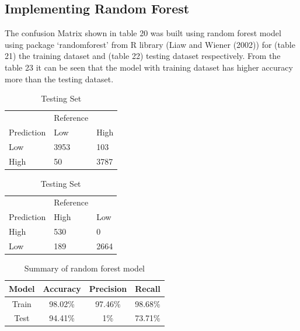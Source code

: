\documentclass[
  a4paper,
]{article}
\begin{document}
\newpage

\hypertarget{implementing-random-forest}{%
\subsection{Implementing Random
Forest}\label{implementing-random-forest}}

The confusion Matrix shown in table 20 was built using random forest
model using package `randomforest' from R library (Liaw and Wiener
(2002)) for (table 21) the training dataset and (table 22) testing
dataset respectively. From the table 23 it can be seen that the model
with training dataset has higher accuracy more than the testing dataset.

\begin{table}[!htb]
    \caption{Confusion matrix of random forest model}
    \begin{minipage}{.5\linewidth}
      \caption{Training Set}
      \centering
        \begin{tabular}{lll}
        & Reference & \\
         Prediction  & Low & High\\
           Low & 3953 & 103 \\
          High & 50 & 3787 \\
        \end{tabular}
    \end{minipage}%
    \begin{minipage}{.5\linewidth}
      \centering
        \caption{Testing Set}
        \begin{tabular}{lll}
          & Reference & \\
          Prediction  & High & Low \\
           High & 530 & 0 \\
            Low & 189 & 2664\\
        \end{tabular}
    \end{minipage} 
\end{table}

\begin{table}[!htb]
\caption{Summary of random forest model} 
\centering
\begin{tabular}{c@{\hskip 0.5in}c@{\hskip 0.5in}c@{\hskip 0.5in}c@{\hskip 0.5in}}
\hline\hline
Model & Accuracy & Precision & Recall \\ [0.5ex]
\hline
Train & 98.02\% & 97.46\% & 98.68\% \\ 
Test & 94.41\% & 1\% & 73.71\% \\[1ex]
\hline
\end{tabular}
\end{table}
\end{document}

